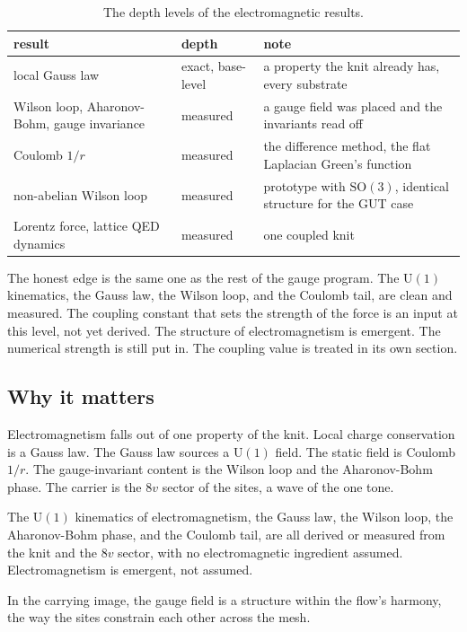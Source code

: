 \begin{table}[ht]
\centering
\begin{tabular}{@{}lll@{}}
\toprule
result & depth & note \\
\midrule
local Gauss law & exact, base-level & a property the knit already has, every substrate \\
Wilson loop, Aharonov-Bohm, gauge invariance & measured & a gauge field was placed and the invariants read off \\
Coulomb $1/r$ & measured & the difference method, the flat Laplacian Green's function \\
non-abelian Wilson loop & measured & prototype with $\mathrm{SO}(3)$, identical structure for the GUT case \\
Lorentz force, lattice QED dynamics & measured & one coupled knit \\
\bottomrule
\end{tabular}
\caption{The depth levels of the electromagnetic results.}
\label{tab:em-depth}
\end{table}

The honest edge is the same one as the rest of the gauge program. The $\mathrm{U}(1)$ kinematics, the Gauss law, the Wilson loop, and the Coulomb tail, are clean and measured. The coupling constant that sets the strength of the force is an input at this level, not yet derived. The structure of electromagnetism is emergent. The numerical strength is still put in. The coupling value is treated in its own section.

\subsection{Why it matters}

Electromagnetism falls out of one property of the knit. Local charge conservation is a Gauss law. The Gauss law sources a $\mathrm{U}(1)$ field. The static field is Coulomb $1/r$. The gauge-invariant content is the Wilson loop and the Aharonov-Bohm phase. The carrier is the $8v$ sector of the sites, a wave of the one tone.

\begin{result}
The $\mathrm{U}(1)$ kinematics of electromagnetism, the Gauss law, the Wilson loop, the Aharonov-Bohm phase, and the Coulomb tail, are all derived or measured from the knit and the $8v$ sector, with no electromagnetic ingredient assumed. Electromagnetism is emergent, not assumed.
\end{result}

In the carrying image, the gauge field is a structure within the flow's harmony, the way the sites constrain each other across the mesh.
